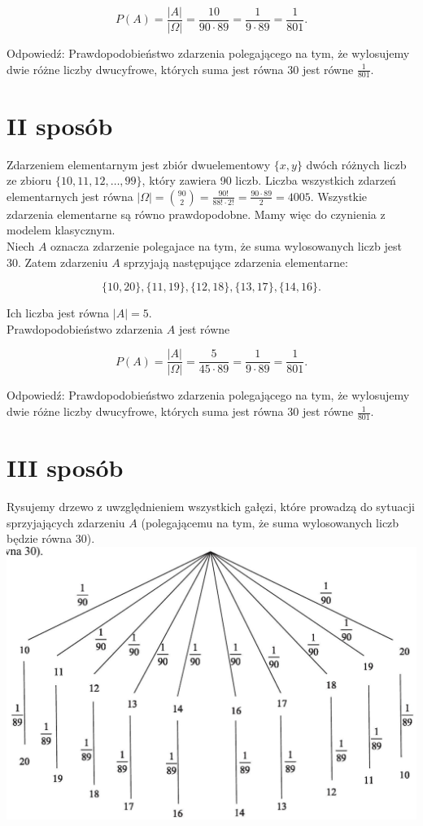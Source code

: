 \documentclass[10pt]{article}
\begin{document}
$$
P(A)=\frac{|A|}{|\Omega|}=\frac{10}{90 \cdot 89}=\frac{1}{9 \cdot 89}=\frac{1}{801} .
$$

Odpowiedź: Prawdopodobieństwo zdarzenia polegającego na tym, że wylosujemy dwie różne liczby dwucyfrowe, których suma jest równa 30 jest równe $\frac{1}{801}$.

\section*{II sposób}
Zdarzeniem elementarnym jest zbiór dwuelementowy $\{x, y\}$ dwóch różnych liczb ze zbioru $\{10,11,12, \ldots, 99\}$, który zawiera 90 liczb. Liczba wszystkich zdarzeń elementarnych jest równa $|\Omega|=\binom{90}{2}=\frac{90!}{88!\cdot 2!}=\frac{90 \cdot 89}{2}=4005$. Wszystkie zdarzenia elementarne są równo prawdopodobne. Mamy więc do czynienia z modelem klasycznym.\\
Niech $A$ oznacza zdarzenie polegajace na tym, że suma wylosowanych liczb jest 30. Zatem zdarzeniu $A$ sprzyjają następujące zdarzenia elementarne:

$$
\{10,20\},\{11,19\},\{12,18\},\{13,17\},\{14,16\} .
$$

Ich liczba jest równa $|A|=5$.\\
Prawdopodobieństwo zdarzenia $A$ jest równe

$$
P(A)=\frac{|A|}{|\Omega|}=\frac{5}{45 \cdot 89}=\frac{1}{9 \cdot 89}=\frac{1}{801} .
$$

Odpowiedź: Prawdopodobieństwo zdarzenia polegającego na tym, że wylosujemy dwie różne liczby dwucyfrowe, których suma jest równa 30 jest równe $\frac{1}{801}$.

\section*{III sposób}
Rysujemy drzewo z uwzględnieniem wszystkich gałęzi, które prowadzą do sytuacji sprzyjających zdarzeniu $A$ (polegającemu na tym, że suma wylosowanych liczb będzie równa 30).\\
\includegraphics[max width=\textwidth, center]{2025_02_07_261058dfc2ab779a027ag-18}
\end{document}
